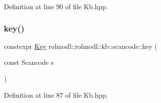 Definition at line 90 of file Kb.\+hpp.

\mbox{\label{namespacerolmodl_1_1rolmodl_1_1kb_1_1scancode_a282f2e12428e4cffc289b08c07c2439f}} 
\subsubsection{\texorpdfstring{key()}{key()}}
{\footnotesize\ttfamily constexpr \mbox{\hyperlink{namespacerolmodl_1_1rolmodl_1_1kb_a188e00b289aeb95ae45fb6bf2923e7e2}{Key}} rolmodl\+::rolmodl\+::kb\+::scancode\+::key (\begin{DoxyParamCaption}\item[{const Scancode}]{s }\end{DoxyParamCaption})\hspace{0.3cm}{\ttfamily [noexcept]}}



Definition at line 87 of file Kb.\+hpp.

